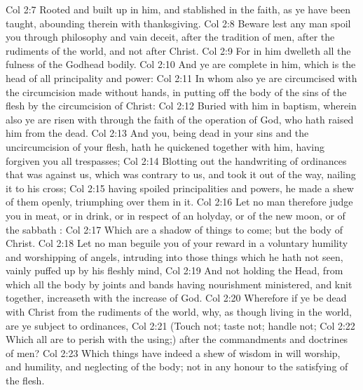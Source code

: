 \vs Col 2:7 Rooted and built up in him, and stablished in the faith, as ye have been taught, abounding therein with thanksgiving.
\vs Col 2:8 Beware lest any man spoil you through philosophy and vain deceit, after the tradition of men, after the rudiments of the world, and not after Christ.
\vs Col 2:9 For in him dwelleth all the fulness of the Godhead bodily.
\vs Col 2:10 And ye are complete in him, which is the head of all principality and power:
\vs Col 2:11 In whom also ye are circumcised with the circumcision made without hands, in putting off the body of the sins of the flesh by the circumcision of Christ:
\vs Col 2:12 Buried with him in baptism, wherein also ye are risen with  through the faith of the operation of God, who hath raised him from the dead.
\vs Col 2:13 And you, being dead in your sins and the uncircumcision of your flesh, hath he quickened together with him, having forgiven you all trespasses;
\vs Col 2:14 Blotting out the handwriting of ordinances that was against us, which was contrary to us, and took it out of the way, nailing it to his cross;
\vs Col 2:15  having spoiled principalities and powers, he made a shew of them openly, triumphing over them in it.
\vs Col 2:16 Let no man therefore judge you in meat, or in drink, or in respect of an holyday, or of the new moon, or of the sabbath :
\vs Col 2:17 Which are a shadow of things to come; but the body  of Christ.
\vs Col 2:18 Let no man beguile you of your reward in a voluntary humility and worshipping of angels, intruding into those things which he hath not seen, vainly puffed up by his fleshly mind,
\vs Col 2:19 And not holding the Head, from which all the body by joints and bands having nourishment ministered, and knit together, increaseth with the increase of God.
\vs Col 2:20 Wherefore if ye be dead with Christ from the rudiments of the world, why, as though living in the world, are ye subject to ordinances,
\vs Col 2:21 (Touch not; taste not; handle not;
\vs Col 2:22 Which all are to perish with the using;) after the commandments and doctrines of men?
\vs Col 2:23 Which things have indeed a shew of wisdom in will worship, and humility, and neglecting of the body; not in any honour to the satisfying of the flesh.
